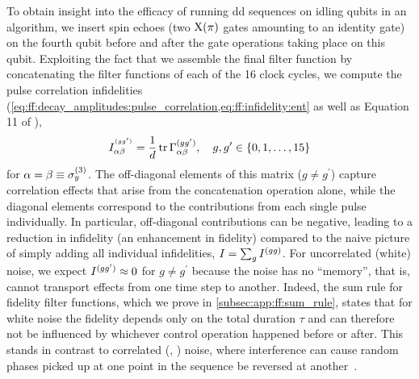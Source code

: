 To obtain insight into the efficacy of running \gls{dd} sequences on idling qubits in an algorithm, we insert spin echoes (two $\mathrm{X}(\pi)$ gates amounting to an identity gate) on the fourth qubit before and after the gate operations taking place on this qubit.
Exploiting the fact that we assemble the final filter function by concatenating the filter functions of each of the 16 clock cycles, we compute the pulse correlation infidelities (\cf \cref{eq:ff:decay_amplitudes:pulse_correlation,eq:ff:infidelity:ent} as well as Equation 11 of ),
\begin{equation}
    I_{\alpha\beta}^{\gth{gg^\prime}} = \frac{1}{d}\tr \decayamps_{\alpha\beta}\gth{gg^\prime}\qc g,g^{\prime}\in\lbrace 0, 1, \dotsc, 15\rbrace
\end{equation}
for $\alpha=\beta\equiv\sigma_y^{(3)}$.
The off-diagonal elements of this matrix ($g\neq g^{\prime}$) capture correlation effects that arise from the concatenation operation alone, while the diagonal elements correspond to the contributions from each single pulse
individually.
In particular, off-diagonal contributions can be negative, leading to a reduction in infidelity (an enhancement in fidelity) compared to the naive picture of simply adding all individual infidelities,
$I=\sum_g I^{(gg)}$.
For uncorrelated (white) noise, we expect $I^{(gg^{\prime})}\approx 0$ for $g\neq g^{\prime}$ because the noise has no \enquote{memory}, that is, cannot transport effects from one time step to another.
Indeed, the sum rule for fidelity filter functions, which we prove in \cref{subsec:app:ff:sum_rule}, states that for white noise the fidelity depends only on the total duration $\tau$ and can therefore not be influenced by whichever control operation happened before or after.
This stands in contrast to correlated (\eg, \oneoverf) noise, where interference can cause random phases picked up at one point in the sequence be reversed at another~\cite{Cerfontaine2021}.

